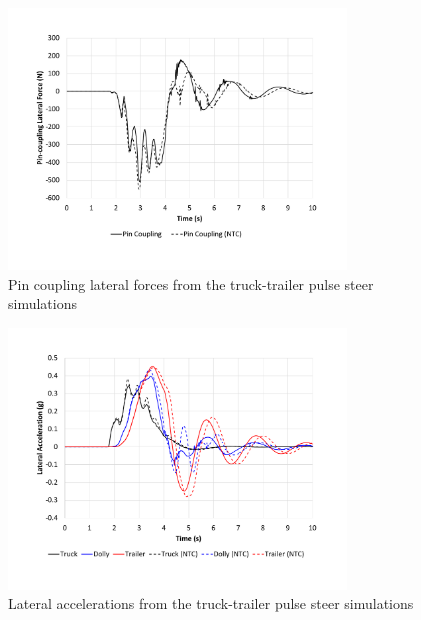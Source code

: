 \begin{figure}[H]
	\centering
	\includegraphics[width=0.8\textwidth]{fig/ntc-truck-trailer_psf}
	\caption{Pin coupling lateral forces from the truck-trailer pulse steer simulations}
	\label{figure:ntc-truck-trailer_psf}
\end{figure}

\begin{figure}[H]
	\centering
	\includegraphics[width=0.8\textwidth]{fig/ntc-truck-trailer_psg}
	\caption{Lateral accelerations from the truck-trailer pulse steer simulations}
	\label{figure:ntc-truck-trailer_psg}
\end{figure}

